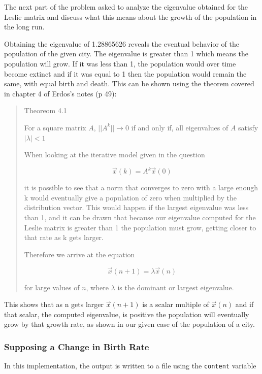 \documentclass[letterpaper,12pt]{article}
\begin{document}
The next part of the problem asked to analyze the eigenvalue obtained for the
Leslie matrix and discuss what this means about the growth of the population in
the long run.

Obtaining the eigenvalue of 1.28865626 reveals the eventual behavior of the
population of the given city.
The eigenvalue is greater than 1 which means the population will grow.
If it was less than 1, the population would over time become extinct and if
it was equal to 1 then the population would remain the same, with equal birth and death.
This can be shown using the theorem covered in chapter 4 of Erdos's notes (p 49):

\begin{quote}
Theoreom 4.1

For a square matrix $A$,
$||A^k|| \to 0$ if and only if, all eigenvalues of $A$ satisfy $|\lambda| < 1$

When looking at the iterative model given in the question 

\[\vec{x}(k) = A^k \vec{x}(0)\]

it is possible to see that a norm that converges to zero with a large enough k would eventually give a population of zero when multiplied by the distribution vector.
This would happen if the largest eigenvalue was less than 1, and it can be drawn that because our eigenvalue computed for
the Leslie matrix is greater than 1 the population must grow, getting closer to that rate as k gets larger.

Therefore we arrive at the equation

\[\vec{x}(n+1) = \lambda\vec{x}(n)\]

for large values of $n$, where $\lambda$ is the dominant or largest eigenvalue.
\end{quote}

This shows that as n gets larger $\vec{x}(n+1)$ is a scalar multiple of $\vec{x}(n)$ and if that scalar,
the computed eigenvalue, is positive the population will eventually grow by that growth rate,
as shown in our given case of the population of a city.

\subsubsection{Supposing a Change in Birth Rate}

In this implementation, the output is written to a file using the \texttt{content} variable
\end{document}
